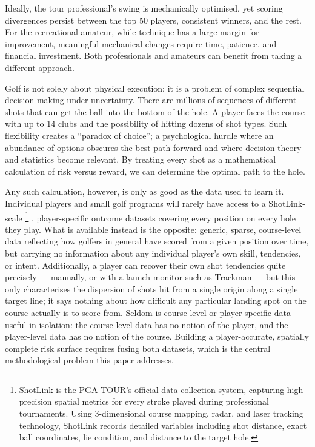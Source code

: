 \documentclass[11pt, letterpaper]{article}
\begin{document}
Ideally, the tour professional's swing is mechanically optimised, yet scoring divergences persist between the top 50 players, consistent winners, and the rest. For the recreational amateur, while technique has a large margin for improvement, meaningful mechanical changes require time, patience, and financial investment. Both professionals and amateurs can benefit from taking a different approach.

Golf is not solely about physical execution; it is a problem of complex sequential decision-making under uncertainty. There are  millions of sequences of different shots that can get the ball into the bottom of the hole. A player faces the course with up to 14 clubs and the possibility of hitting dozens of shot types. Such flexibility creates a ``paradox of choice''; a psychological hurdle where an abundance of options obscures the best path forward \parencite{schwartz2015paradox} and where decision theory and statistics become relevant. By treating every shot as a mathematical calculation of risk versus reward, we can determine the optimal path to the hole. 


Any such calculation, however, is only as good as the data used to learn it. Individual players and small golf programs will rarely have access to a ShotLink-scale \footnote{ShotLink is the PGA TOUR's official data collection system, capturing high-precision spatial metrics for every stroke played during professional tournaments. Using 3-dimensional course mapping, radar, and laser tracking technology, ShotLink records detailed variables including shot distance, exact ball coordinates, lie condition, and distance to the target hole.} \newcite, player-specific outcome datasets covering every position on every hole they play. What is available instead is the opposite: generic, sparse, course-level data reflecting how golfers in general have scored from a given position over time, but carrying no information about any individual player's own skill, tendencies, or intent. Additionally, a player can recover their own shot tendencies quite precisely --- manually, or with a launch monitor such as Trackman \newcite --- but this only characterises the dispersion of shots hit from a single origin along a single target line; it says nothing about how difficult any particular landing spot on the course actually is to score from. Seldom is course-level or player-specific data useful in isolation: the course-level data has no notion of the player, and the player-level data has no notion of the course. Building a player-accurate, spatially complete risk surface requires fusing both datasets, which is the central methodological problem this paper addresses.
\end{document}
